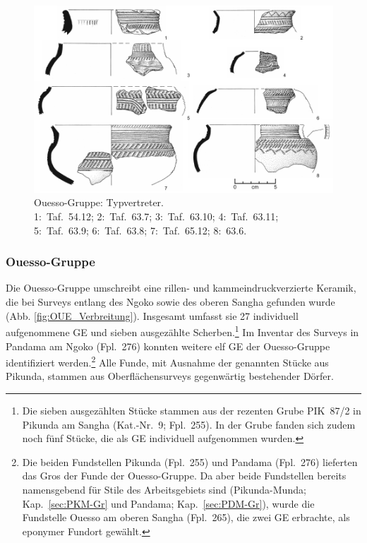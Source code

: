 \begin{figure}[tb]
	\begin{minipage}[b]{.2\textwidth}
		\caption{Ouesso-Gruppe: Typvertreter.\\1:~Taf.~54.12; 2:~Taf.~63.7; 3:~Taf.~63.10; 4:~Taf.~63.11; 5:~Taf.~63.9; 6:~Taf.~63.8; 7:~Taf.~65.12; 8:~63.6.}
		\label{fig:OUE_Typvertreter}
	\end{minipage}\hfill
	\begin{minipage}[b]{.8\textwidth}
		\includegraphics[width=\textwidth]{fig/OUE-Typen.pdf}
		
	\end{minipage}
\end{figure}

\subsubsection{Ouesso-Gruppe}\label{sec:OUE-Gr}

Die Ouesso-Gruppe umschreibt eine rillen- und kammeindruckverzierte Keramik, die bei Surveys entlang des \mbox{Ngoko} sowie des oberen \mbox{Sangha} gefunden wurde (Abb. \ref{fig:OUE_Verbreitung}). Insgesamt umfasst sie 27 individuell aufgenommene GE und sieben ausgezählte Scherben.\footnote{Die sieben ausgezählten Stücke stammen aus der rezenten Grube PIK~87/2 in Pikunda am \mbox{Sangha} (Kat.-Nr.~9; Fpl.~255). In der Grube fanden sich zudem noch fünf Stücke, die als GE individuell aufgenommen wurden.} Im Inventar des Surveys in Pandama am \mbox{Ngoko} (Fpl.~276) konnten weitere elf GE der Ouesso-Gruppe identifiziert werden.\footnote{Die beiden Fundstellen Pikunda (Fpl.~255) und Pandama (Fpl.~276) lieferten das Gros der Funde der Ouesso-Gruppe. Da aber beide Fundstellen bereits namensgebend für Stile des Arbeitsgebiets sind (Pikunda-Munda; Kap.~\ref{sec:PKM-Gr} und Pandama; Kap.~\ref{sec:PDM-Gr}), wurde die Fundstelle Ouesso am oberen \mbox{Sangha} (Fpl.~265), die zwei GE erbrachte, als eponymer Fundort gewählt.} Alle Funde, mit Ausnahme der genannten Stücke aus Pikunda, stammen aus Oberflächensurveys gegenwärtig bestehender Dörfer.

